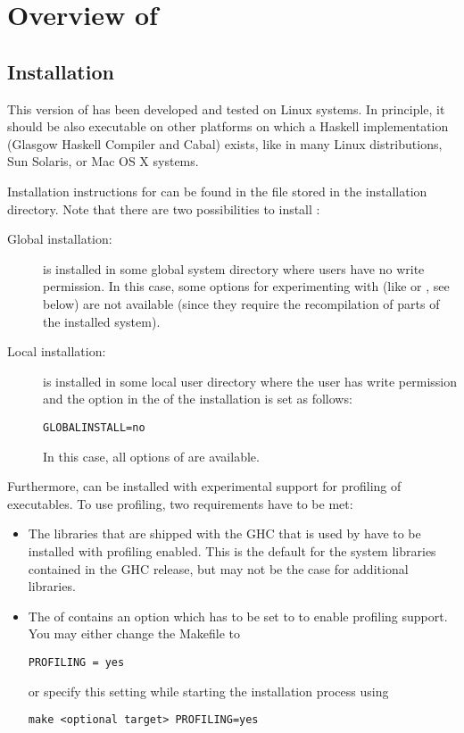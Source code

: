 \section{Overview of \CYS}

\subsection{Installation}
\label{sec-install}

This version of \CYS has been developed and
tested on Linux systems.
In principle, it should be also executable on other
platforms on which a Haskell implementation (Glasgow Haskell Compiler
and Cabal) exists, like in many Linux distributions, Sun Solaris,
or Mac OS X systems.

Installation instructions for \CYS can be found in
the file  stored in the \CYS installation directory.
Note that there are two possibilities to install \CYS:
\begin{description}
\item[Global installation:]
\CYS is installed in some global system directory where users
have no write permission. In this case, some options for experimenting
with \CYS (like  or , see below)
are not available (since they require the recompilation of parts of
the installed system).
\item[Local installation:]
\CYS is installed in some local user directory where the user
has write permission and the option 
in the  of the \CYS installation is set as follows:
\begin{lstlisting}
GLOBALINSTALL=no
\end{lstlisting}
In this case, all options of \CYS are available.
\end{description}
%
Furthermore, \CYS can be installed with experimental support
for profiling
of executables. To use profiling, two requirements have to be met:
\begin{itemize}
\item The libraries that are shipped with the GHC that is used by \CYS
have to be installed with profiling enabled. This is the default for the system
libraries contained in the GHC release, but may not be the case for additional
libraries.
\item The  of \CYS contains an option 
which has to be set to  to enable profiling support. You may
either change the Makefile to
\begin{lstlisting}
PROFILING = yes
\end{lstlisting}
or specify this setting while starting the installation process using
\begin{lstlisting}
make <optional target> PROFILING=yes
\end{lstlisting}
\end{itemize}


